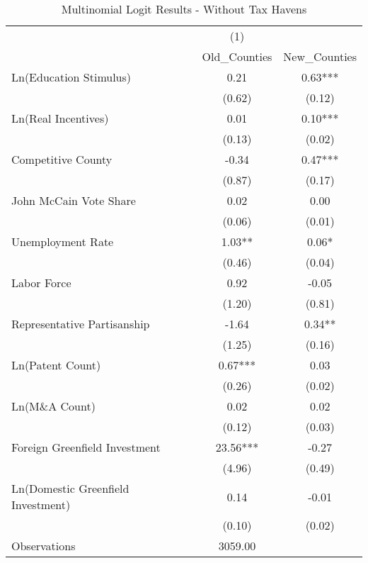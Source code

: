 \begin{table}[!htbp]\centering
\def\sym#1{\ifmmode^{#1}\else\(^{#1}\)\fi}
\caption{Multinomial Logit Results - Without Tax Havens}
\begin{tabular}{l*{2}{c}}
\hline\hline
                    &         (1)   &               \\
                    &Old_Counties   &New_Counties   \\
\hline
Ln(Education Stimulus)&        0.21   &        0.63***\\
                    &      (0.62)   &      (0.12)   \\
Ln(Real Incentives) &        0.01   &        0.10***\\
                    &      (0.13)   &      (0.02)   \\
Competitive County  &       -0.34   &        0.47***\\
                    &      (0.87)   &      (0.17)   \\
John McCain Vote Share&        0.02   &        0.00   \\
                    &      (0.06)   &      (0.01)   \\
Unemployment Rate   &        1.03** &        0.06*  \\
                    &      (0.46)   &      (0.04)   \\
Labor Force         &        0.92   &       -0.05   \\
                    &      (1.20)   &      (0.81)   \\
Representative Partisanship&       -1.64   &        0.34** \\
                    &      (1.25)   &      (0.16)   \\
Ln(Patent Count)    &        0.67***&        0.03   \\
                    &      (0.26)   &      (0.02)   \\
Ln(M\&A Count)      &        0.02   &        0.02   \\
                    &      (0.12)   &      (0.03)   \\
Foreign Greenfield Investment&       23.56***&       -0.27   \\
                    &      (4.96)   &      (0.49)   \\
Ln(Domestic Greenfield Investment)&        0.14   &       -0.01   \\
                    &      (0.10)   &      (0.02)   \\
\hline
Observations        &     3059.00   &               \\

\end{tabular}
\end{table}
